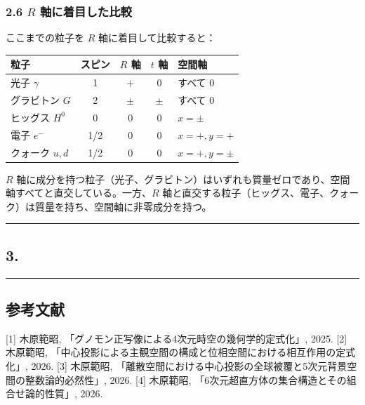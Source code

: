 \documentclass[
  a4paper,11pt]{ltjsarticle}
\newcounter{none}
\theoremstyle{definition}
\theoremstyle{remark}
\begin{document}
\subsubsection{\texorpdfstring{2.6 \(R\)
軸に着目した比較}{2.6 R 軸に着目した比較}}\label{r-ux8ef8ux306bux7740ux76eeux3057ux305fux6bd4ux8f03}

ここまでの粒子を \(R\) 軸に着目して比較すると：

{\def\LTcaptype{none} %
\begin{longtable}[]{@{}lcccl@{}}
\toprule\noalign{}
粒子 & スピン & \(R\) 軸 & \(t\) 軸 & 空間軸 \\
\midrule\noalign{}
\endhead
\bottomrule\noalign{}
\endlastfoot
光子 \(\gamma\) & 1 & \(+\) & \(0\) & すべて \(0\) \\
グラビトン \(G\) & 2 & \(\pm\) & \(\pm\) & すべて \(0\) \\
ヒッグス \(H^0\) & 0 & \(0\) & \(0\) & \(x = \pm\) \\
電子 \(e^-\) & 1/2 & \(0\) & \(0\) & \(x = +, y = +\) \\
クォーク \(u, d\) & 1/2 & \(0\) & \(0\) & \(x = +, y = \pm\) \\
\end{longtable}
}

\(R\)
軸に成分を持つ粒子（光子、グラビトン）はいずれも質量ゼロであり、空間軸すべてと直交している。一方、\(R\)
軸と直交する粒子（ヒッグス、電子、クォーク）は質量を持ち、空間軸に非零成分を持つ。

\begin{center}\rule{0.5\linewidth}{0.5pt}\end{center}

\subsection{3.}\label{section}

\begin{center}\rule{0.5\linewidth}{0.5pt}\end{center}

\subsection{参考文献}\label{ux53c2ux8003ux6587ux732e}

{[}1{]} 木原範昭, 「グノモン正写像による4次元時空の幾何学的定式化」,
2025. {[}2{]} 木原範昭,
「中心投影による主観空間の構成と位相空間における相互作用の定式化」,
2026. {[}3{]} 木原範昭,
「離散空間における中心投影の全球被覆と5次元背景空間の整数論的必然性」,
2026. {[}4{]} 木原範昭, 「6次元超直方体の集合構造とその組合せ論的性質」,
2026.
\end{document}
